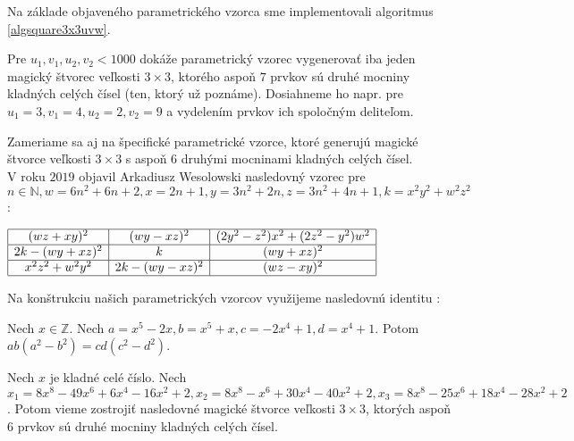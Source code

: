 Na základe objaveného parametrického vzorca sme implementovali algoritmus \ref{algsquare3x3uvw}.

\begin{result} Pre $u_1, v_1, u_2, v_2 < 1000$ dokáže parametrický vzorec vygenerovať iba jeden magický štvorec veľkosti $3 \times 3$, ktorého aspoň $7$ prvkov sú druhé mocniny kladných celých čísel (ten, ktorý už poznáme). Dosiahneme ho napr. pre $u_1 = 3, v_1 = 4, u_2 = 2, v_2 = 9$ a vydelením prvkov ich spoločným deliteľom.
\end{result}

Zameriame sa aj na špecifické parametrické vzorce, ktoré generujú magické štvorce veľkosti $3 \times 3$ s aspoň $6$ druhými mocninami kladných celých čísel. \\

V roku $2019$ objavil Arkadiusz Wesolowski nasledovný vzorec pre $n \in \mathbb{N}, w = 6n^2 + 6n + 2, x = 2n + 1, y = 3n^2 + 2n, z = 3n^2 + 4n + 1, k = x^2 y^2 + w^2 z^2$ \cite{multimagie}:

\begin{center}
$\begin{array}{ |c|c|c| } 
\hline
(wz + xy)^2 & (wy - xz)^2 & (2y^2 - z^2)x^2 + (2z^2 - y^2)w^2 \\ 
\hline
2k - (wy + xz)^2 & k & (wy + xz)^2 \\ 
\hline
x^2 z^2 + w^2 y^2 & 2k - (wy - xz)^2 & (wz - xy)^2 \\
\hline
\end{array}$
\end{center}

Na konštrukciu našich parametrických vzorcov využijeme nasledovnú identitu \cite{algebraic}:


\begin{lemma}
\label{square3x3x}
Nech $x \in \mathbb{Z}$. Nech $a = x^5 - 2x, b = x^5 + x, c = -2x^4 + 1, d = x^4 + 1$. Potom $ab(a^2 - b^2) = cd(c^2 - d^2)$.
\end{lemma}

\begin{theorem}
\label{3x3square6squares}
Nech $x$ je kladné celé číslo. Nech $x_1 = 8x^8 - 49x^6 + 6x^4 - 16x^2 + 2, x_2 = 8x^8 - x^6 + 30x^4 - 40x^2 + 2, x_3 = 8x^8 - 25x^6 + 18x^4 - 28x^2 + 2$. Potom vieme zostrojiť nasledovné magické štvorce veľkosti $3 \times 3$, ktorých aspoň $6$ prvkov sú druhé mocniny kladných celých čísel.
\end{theorem}


